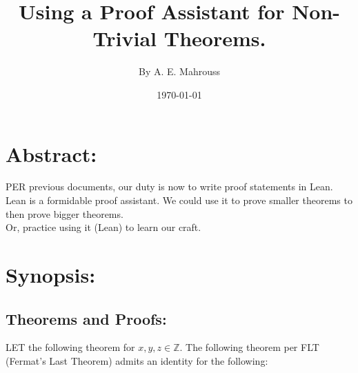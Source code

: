 \documentclass[10pt]{article}
\title{%
	\vspace{-1.5em}%
	\large\textbf{Using a Proof Assistant for Non-Trivial Theorems.}%
}
\author{By A. E. Mahrouss}
\date{\today}
\theoremstyle{plain}
\theoremstyle{definition}
\theoremstyle{remark}
\begin{document}
	
	\maketitle
	\tableofcontents
	\newpage
	
	\section{Abstract:}
	
	\lettrine[lines=2, lhang=0.1, loversize=0.2]{P}ER previous documents, our duty is now to write proof statements in Lean.\\
	Lean is a formidable proof assistant. We could use it to prove smaller theorems to then prove bigger theorems.\\Or, practice using it (Lean) to learn our craft.

	\section{Synopsis:}

	\subsection{Theorems and Proofs:}

	\lettrine[lines=1, lhang=0.1, loversize=0.2]{L}ET the following theorem for $x, y, z \in \mathbb{Z}$. The following theorem per FLT (Fermat's Last Theorem) admits an identity for the following:
	
\end{document}
